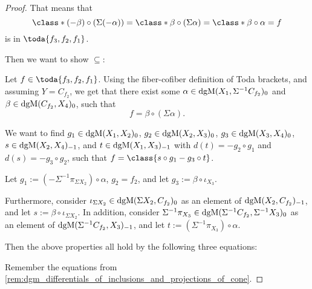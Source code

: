 \begin{proof}
    That means that
    \[
        \class*{(-\beta) \circ (\Sigma (- \alpha))} = \class*{\beta \circ (\Sigma \alpha)} = \class*{\beta \circ \alpha} = f
    \]
    is in \( \toda{f_3, f_2, f_1} \).

    Then we want to show \( \subseteq \):

    Let \( f \in \toda{f_3, f_2, f_1} \). Using the fiber-cofiber definition of Toda brackets, and assuming \( Y = C_{f_2} \), we get that there exist some \( \alpha \in \operatorname{dgM}(X_1, \Sigma^{-1} C_{f_2})_0 \) and \( \beta \in \operatorname{dgM}(C_{f_2}, X_4)_0 \), such that
    \[
        f = \beta \circ (\Sigma \alpha).
    \]

    We want to find \( g_1 \in \operatorname{dgM}(X_1, X_2)_0 \), \( g_2 \in \operatorname{dgM}(X_2, X_3)_0 \), \( g_3 \in \operatorname{dgM}(X_3, X_4)_0 \), \( s \in \operatorname{dgM}(X_2, X_4)_{-1} \), and \( t \in \operatorname{dgM}(X_1, X_3)_{-1} \) with \( d(t) = - g_2 \circ g_1 \) and \( d(s) = -g_3 \circ g_2 \), such that \( f = \class{s \circ g_1 - g_3 \circ t} \).

    Let \( g_1 := (-\Sigma^{-1} \pi_{\Sigma X_2}) \circ \alpha \), \( g_2 = f_2 \), and let \( g_3 := \beta \circ \iota_{X_3} \). 

    Furthermore, consider \( \iota_{\Sigma X_2} \in \operatorname{dgM}(\Sigma X_2, C_{f_2})_0 \) as an element of \( \operatorname{dgM}(X_2, C_{f_2})_{-1} \), and let \( s := \beta \circ \iota_{\Sigma X_2} \). In addition, consider \( \Sigma^{-1} \pi_{X_3} \in \operatorname{dgM}(\Sigma^{-1} C_{f_2}, \Sigma^{-1} X_3)_0 \) as an element of \( \operatorname{dgM}(\Sigma^{-1} C_{f_2}, X_3)_{-1} \), and let \( t := (\Sigma^{-1} \pi_{X_3}) \circ \alpha \).

    Then the above properties all hold by the following three equations:

    Remember the equations from \autoref{rem:dgm_differentials_of_inclusions_and_projections_of_cone}.


\end{proof}
